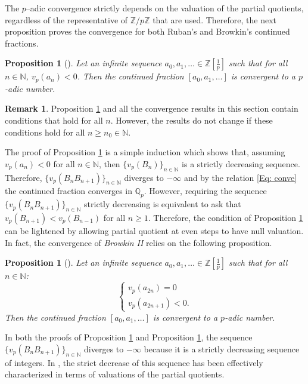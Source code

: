 \documentclass[12pt, reqno]{amsart}
\theoremstyle{plain}
\newtheorem{Proposition}[Theorem]{Proposition}
\theoremstyle{definition}
\newtheorem{Remark}[Theorem]{Remark}
\begin{document}
The $p$--adic convergence strictly depends on the valuation of the partial quotients, regardless of the representative of $\mathbb{Z}/p\mathbb{Z}$ that are used. Therefore, the next proposition proves the convergence for both Ruban's and Browkin's continued fractions.

\begin{Proposition}[\cite{BI}]\label{Prop: ConvBr1}
Let an infinite sequence $a_0,a_1,\ldots\in \mathbb{Z}[\frac{1}{p}]$ such that for all $n\in\mathbb{N}$, $v_p(a_n)<0$. Then the continued fraction $[a_0,a_1,\ldots]$ is convergent to a $p$-adic number.
\end{Proposition}

\begin{Remark}
Proposition \ref{Prop: ConvBr1} and all the convergence results in this section contain conditions that hold for all $n$. However, the results do not change if these conditions hold for all $n\geq n_0\in\mathbb{N}$.
\end{Remark}

The proof of Proposition \ref{Prop: ConvBr1} is a simple induction which shows that, assuming  $v_p(a_n)<0$ for all $n\in\mathbb{N}$, then $\{v_p(B_n)\}_{n\in\mathbb{N}}$ is a strictly decreasing sequence. Therefore, $\{v_p(B_nB_{n+1})\}_{n\in\mathbb{N}}$ diverges to $-\infty$ and by the relation \eqref{Eq: conve} the continued fraction converges in $\mathbb{Q}_p$. However, requiring the sequence $\{v_p(B_nB_{n+1})\}_{n\in\mathbb{N}}$ strictly decreasing is equivalent to ask that $v_p(B_{n+1})<v_p(B_{n-1})$ for all $n\geq 1$. Therefore, the condition of Proposition \ref{Prop: ConvBr1} can be lightened by allowing partial quotient at even steps to have null valuation. In fact, the convergence of \textit{Browkin II} relies on the following proposition.

\begin{Proposition}[\cite{BII}]\label{Prop: ConvBr2}
Let an infinite sequence $a_0,a_1,\ldots\in \mathbb{Z}[\frac{1}{p}]$ such that for all $n\in\mathbb{N}$:
\begin{equation}
\begin{cases}
v_p(a_{2n})=0\\
v_p(a_{2n+1})<0.
\end{cases}
\end{equation}
Then the continued fraction $[a_0,a_1,\ldots]$ is convergent to a $p$-adic number.
\end{Proposition}
In both the proofs of Proposition \ref{Prop: ConvBr1} and Proposition \ref{Prop: ConvBr2}, the sequence $\{v_p(B_nB_{n+1})\}_{n\in\mathbb{N}}$ diverges to $-\infty$ because it is a strictly decreasing sequence of integers. In \cite{MRSII}, the strict decrease of this sequence has been effectively characterized in terms of valuations of the partial quotients. 
\end{document}
